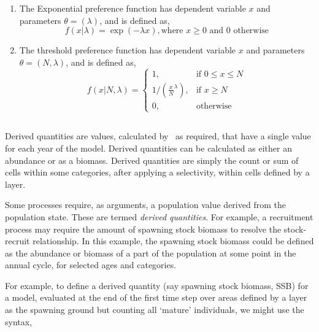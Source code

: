 \begin{enumerate}
\item The Exponential preference function has dependent variable $x$ and parameters $\theta = (\lambda)$, and is defined as,
\begin{equation}
  f(x | \lambda) =\exp(-\lambda x), \text{where $x \geq 0$ and $0$ otherwise}
\end{equation}

\item The threshold preference function has dependent variable $x$ and parameters $\theta = (N,\lambda)$, and is defined as,
\begin{equation}
  f(x | N, \lambda) = \begin{cases}
    1, & \text{if $0 \le x \leq N$} \\
    1/\left({\frac{x}{N}}^\lambda\right), & \text{if $x \ge N$}\\
    0, & \text{otherwise}
  \end{cases}
\end{equation}

\end{enumerate}

\subsection{\label{sec:derived-quantities}}

Derived quantities are values, calculated by \SPM\ as required, that have a single value for each year of the model. Derived quantities can be calculated as either an abundance or as a biomass. Derived quantities are simply the count or sum of cells within some categories, after applying a selectivity, within cells defined by a layer.

Some processes require, as arguments, a population value derived from the population state. These are termed \emph{derived quantities}. For example, a recruitment process may require the amount of spawning stock biomass to resolve the stock-recruit relationship. In this example, the spawning stock biomass could be defined as the abundance or biomass of a part of the population at some point in the annual cycle, for selected ages and categories.

For example, to define a derived quantity (say spawning stock biomass, SSB) for a model, evaluated at the end of the first time step over areas defined by a layer as the spawning ground but counting all `mature' individuals, we might use the syntax,

